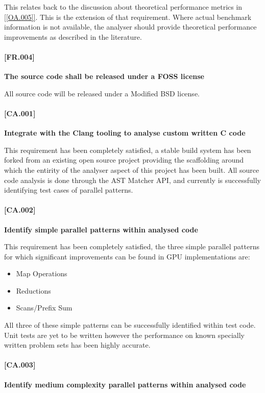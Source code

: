 This relates back to the discussion about theoretical performance metrics in \ref{[OA.005]}. This is the extension of that requirement. Where actual benchmark information is not available, the analyser should provide theoretical performance improvements as described in the literature.

\paragraph{[FR.004]}
\textbf{The source code shall be released under a FOSS license}

All source code will be released under a Modified BSD license.


\paragraph{[CA.001]}
\textbf{Integrate with the Clang tooling to analyse custom written C code}

This requirement has been completely satisfied, a stable build system has been forked from an existing open source project providing the scaffolding around which the entirity of the analyser aspect of this project has been built. All source code analysis is done through the AST Matcher API, and currently is successfully identifying test cases of parallel patterns.

\paragraph{[CA.002]}
\textbf{Identify simple parallel patterns within analysed code}

This requirement has been completely satisfied, the three simple parallel patterns for which significant improvements can be found in GPU implementations are:

\begin{itemize}
\item Map Operations
\item Reductions
\item Scans/Prefix Sum
\end{itemize}

All three of these simple patterns can be successfully identified within test code. Unit tests are yet to be written however the performance on known specially written problem sets has been highly accurate.

\paragraph{[CA.003]}
\textbf{Identify medium complexity parallel patterns within analysed code}

